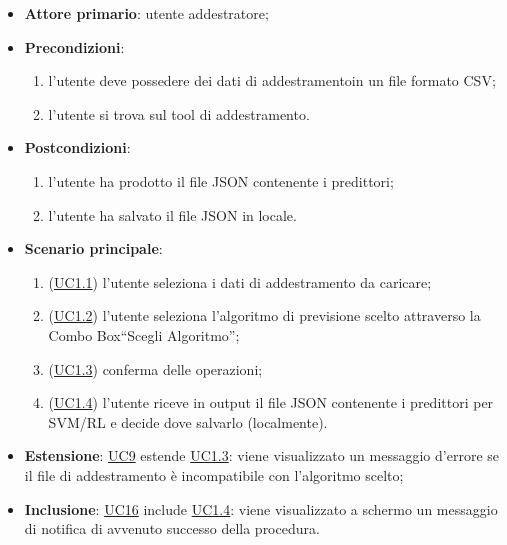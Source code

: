 		\begin{itemize}
			\item\textbf{Attore primario}: utente addestratore;
			\item\textbf{Precondizioni}: 
				\begin{enumerate}
					\item l’utente deve possedere dei dati di addestramento\glo in un file formato CSV\glo;
					\item l’utente si trova sul tool di addestramento.
				\end{enumerate}
			\item\textbf{Postcondizioni}:
				\begin{enumerate}
					\item l’utente ha prodotto il file JSON contenente i predittori;
					\item l’utente ha salvato il file JSON in locale.
				\end{enumerate}
			\item\textbf{Scenario principale}:
				\begin{enumerate}
					\item (\hyperref[par:UC1.1]{UC1.1}) l’utente seleziona i dati di addestramento da caricare;
					\item (\hyperref[par:UC1.2]{UC1.2}) l’utente seleziona l’algoritmo di previsione scelto attraverso la Combo Box\glo “Scegli Algoritmo”; 
					\item (\hyperref[par:UC1.3]{UC1.3}) conferma delle operazioni; 
					\item (\hyperref[par:UC1.4]{UC1.4}) l’utente riceve in output il file JSON contenente i predittori per SVM/RL e decide dove salvarlo (localmente).  
				\end{enumerate}
			\item\textbf{Estensione}: \hyperref[par:UC9]{UC9} estende \hyperref[par:UC1.3]{UC1.3}: viene visualizzato un messaggio d’errore se il file di addestramento è incompatibile con l’algoritmo scelto;
			\item\textbf{Inclusione}: \hyperref[par:UC16]{UC16} include \hyperref[par:UC1.4]{UC1.4}: viene visualizzato a schermo un messaggio di notifica di avvenuto successo della procedura.
		\end{itemize}
		
		\label{par:UC1.1}
